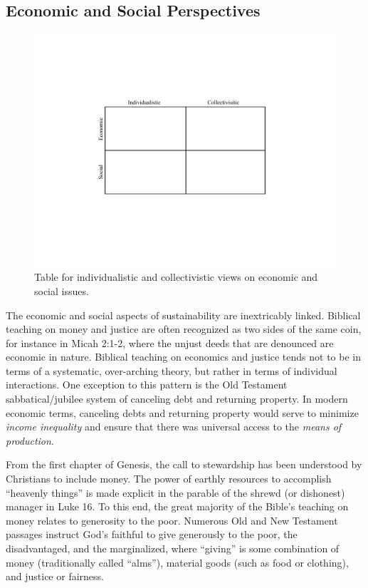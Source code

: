 \documentclass[12pt]{article}
\begin{document}
\subsection{Economic and Social Perspectives}
\label{sec:economic_and_social}

\begin{figure}
\centering
\includegraphics[width=0.75\linewidth]{figure_other/QuadTable}
\caption{Table for individualistic and collectivistic views on economic and social issues.}
\label{fig:table}
\end{figure}


The economic and social aspects of sustainability are inextricably linked. Biblical teaching on money
and justice are often recognized as two sides of the same coin, for instance in Micah 2:1-2, where the unjust deeds that
are denounced are economic in nature. Biblical teaching on economics and justice tends not to be in terms of a
systematic, over-arching theory, but rather in terms of individual interactions.
One exception to this pattern is the Old Testament sabbatical/jubilee system of canceling debt and returning property. 
In modern economic terms, canceling debts and returning property would serve to minimize 
\emph{income inequality} and ensure that there was universal access to the \emph{means of production}.

From the first chapter of Genesis, the call to stewardship has
been understood by Christians to include money. The power of earthly resources to accomplish ``heavenly things'' is made
explicit in the parable of the shrewd (or dishonest) manager in Luke 16. To this end, the great majority of the Bible's
teaching on money relates to generosity to the poor. Numerous Old and New Testament passages instruct God's faithful to
give generously to the poor, the disadvantaged, and the marginalized, where ``giving'' is some combination of money
(traditionally called ``alms''), material goods (such as food or clothing), and justice or fairness.
\end{document}
